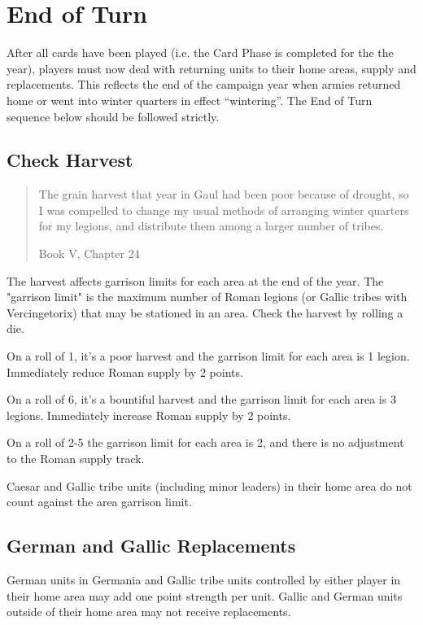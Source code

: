 \section{End of Turn}
\par
After all cards have been played (i.e. the Card Phase is completed for the the year), players must now deal with returning units to their home areas, supply and replacements. This reflects the end of the campaign year when armies returned home or went into winter quarters in effect “wintering”. The End of Turn sequence below should be followed strictly.

\subsection{Check Harvest}
\blockquote[Book V, Chapter 24]{The grain harvest that year in Gaul had been poor because of drought, so I was compelled to change my usual methods of arranging winter quarters for my legions, and distribute them among a larger number of tribes.}
\par
The harvest affects garrison limits for each area at the end of the year. The "garrison limit" is the maximum number of Roman legions (or Gallic tribes with Vercingetorix) that may be stationed in an area. Check the harvest by rolling a die.

On a roll of 1, it’s a poor harvest and the garrison limit for each area is 1 legion. Immediately reduce Roman supply by 2 points.

On a roll of 6, it’s a bountiful harvest and the garrison limit for each area is 3 legions. Immediately increase Roman supply by 2 points.

On a roll of 2-5 the garrison limit for each area is 2, and there is no adjustment to the Roman supply track.

Caesar and Gallic tribe units (including minor leaders) in their home area do not count against the area garrison limit.

\raggedbottom

\subsection{German and Gallic Replacements}
\par
German units in Germania and Gallic tribe units controlled by either player in their home area may add one point strength per unit. Gallic and German units outside of their home area may not receive replacements.

